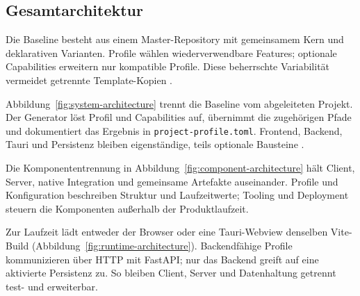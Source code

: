 \subsection{Gesamtarchitektur}
\label{subsec:gesamtarchitektur}

Die Baseline besteht aus einem Master-Repository mit gemeinsamem Kern und
deklarativen Varianten. Profile wählen wiederverwendbare Features; optionale
Capabilities erweitern nur kompatible Profile. Diese beherrschte Variabilität
vermeidet getrennte Template-Kopien
\parencite{clements2001software-product-lines,kleiveist2026profiles}.



Abbildung~\ref{fig:system-architecture} trennt die Baseline vom abgeleiteten
Projekt. Der Generator löst Profil und Capabilities auf, übernimmt die
zugehörigen Pfade und dokumentiert das Ergebnis in
\texttt{project-profile.toml}. Frontend, Backend, Tauri und Persistenz bleiben
eigenständige, teils optionale Bausteine
\parencite{kleiveist2026architecture}.



Die Komponententrennung in Abbildung~\ref{fig:component-architecture} hält
Client, Server, native Integration und gemeinsame Artefakte auseinander.
Profile und Konfiguration beschreiben Struktur und Laufzeitwerte; Tooling und
Deployment steuern die Komponenten außerhalb der Produktlaufzeit.



Zur Laufzeit lädt entweder der Browser oder eine Tauri-Webview denselben
Vite-Build (Abbildung~\ref{fig:runtime-architecture}). Backendfähige Profile
kommunizieren über HTTP mit FastAPI; nur das Backend greift auf eine aktivierte
Persistenz zu. So bleiben Client, Server und Datenhaltung getrennt test- und
erweiterbar.
